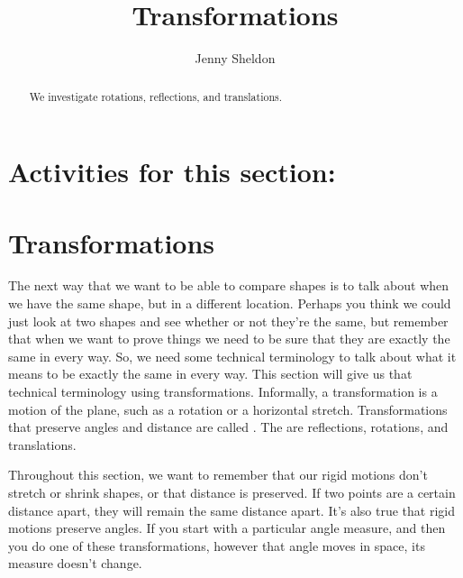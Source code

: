 \documentclass{ximera}
\title{Transformations}
\author{Jenny Sheldon}
\begin{document}
\begin{abstract}
We investigate rotations, reflections, and translations.
\end{abstract}
\maketitle

\section{Activities for this section:} 

\section{Transformations}

The next way that we want to be able to compare shapes is to talk about when we have the same shape, but in a different location. Perhaps you think we could just look at two shapes and see whether or not they're the same, but remember that when we want to prove things we need to be sure that they are exactly the same in every way. So, we need some technical terminology to talk about what it means to be exactly the same in every way. This section will give us that technical terminology using transformations. Informally, a transformation is a motion of the plane, such as a rotation or a horizontal stretch. Transformations that preserve angles and distance are called . The  are reflections, rotations, and translations.


Throughout this section, we want to remember that our rigid motions don't stretch or shrink shapes, or that distance is preserved. If two points are a certain distance apart, they will remain the same distance apart. It's also true that rigid motions preserve angles. If you start with a particular angle measure, and then you do one of these transformations, however that angle moves in space, its measure doesn't change. 

\end{document}
